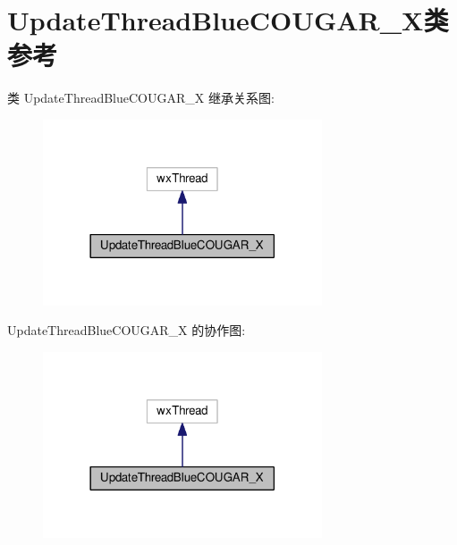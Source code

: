 \hypertarget{class_update_thread_blue_c_o_u_g_a_r___x}{\section{Update\+Thread\+Blue\+C\+O\+U\+G\+A\+R\+\_\+\+X类 参考}
\label{class_update_thread_blue_c_o_u_g_a_r___x}
}


类 Update\+Thread\+Blue\+C\+O\+U\+G\+A\+R\+\_\+\+X 继承关系图\+:
\nopagebreak
\begin{figure}[H]
\begin{center}
\leavevmode
\includegraphics[width=234pt]{class_update_thread_blue_c_o_u_g_a_r___x__inherit__graph}
\end{center}
\end{figure}


Update\+Thread\+Blue\+C\+O\+U\+G\+A\+R\+\_\+\+X 的协作图\+:
\nopagebreak
\begin{figure}[H]
\begin{center}
\leavevmode
\includegraphics[width=234pt]{class_update_thread_blue_c_o_u_g_a_r___x__coll__graph}
\end{center}
\end{figure}
